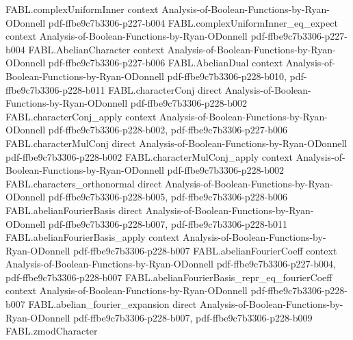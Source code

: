 \begin{theorem}
\label{FABL.abelian_plancherel}
\leanok
{}
\proofstep
  {FABL.complexUniformInner}
  {context}
  {Analysis-of-Boolean-Functions-by-Ryan-ODonnell}
  {pdf-ffbe9c7b3306-p227-b004}
\proofstep
  {FABL.complexUniformInner_eq_expect}
  {context}
  {Analysis-of-Boolean-Functions-by-Ryan-ODonnell}
  {pdf-ffbe9c7b3306-p227-b004}
\proofstep
  {FABL.AbelianCharacter}
  {context}
  {Analysis-of-Boolean-Functions-by-Ryan-ODonnell}
  {pdf-ffbe9c7b3306-p227-b006}
\proofstep
  {FABL.AbelianDual}
  {context}
  {Analysis-of-Boolean-Functions-by-Ryan-ODonnell}
  {pdf-ffbe9c7b3306-p228-b010,
    pdf-ffbe9c7b3306-p228-b011}
\proofstep
  {FABL.characterConj}
  {direct}
  {Analysis-of-Boolean-Functions-by-Ryan-ODonnell}
  {pdf-ffbe9c7b3306-p228-b002}
\proofstep
  {FABL.characterConj_apply}
  {context}
  {Analysis-of-Boolean-Functions-by-Ryan-ODonnell}
  {pdf-ffbe9c7b3306-p228-b002,
    pdf-ffbe9c7b3306-p227-b006}
\proofstep
  {FABL.characterMulConj}
  {direct}
  {Analysis-of-Boolean-Functions-by-Ryan-ODonnell}
  {pdf-ffbe9c7b3306-p228-b002}
\proofstep
  {FABL.characterMulConj_apply}
  {context}
  {Analysis-of-Boolean-Functions-by-Ryan-ODonnell}
  {pdf-ffbe9c7b3306-p228-b002}
\proofstep
  {FABL.characters_orthonormal}
  {direct}
  {Analysis-of-Boolean-Functions-by-Ryan-ODonnell}
  {pdf-ffbe9c7b3306-p228-b005,
    pdf-ffbe9c7b3306-p228-b006}
\proofstep
  {FABL.abelianFourierBasis}
  {direct}
  {Analysis-of-Boolean-Functions-by-Ryan-ODonnell}
  {pdf-ffbe9c7b3306-p228-b007,
    pdf-ffbe9c7b3306-p228-b011}
\proofstep
  {FABL.abelianFourierBasis_apply}
  {context}
  {Analysis-of-Boolean-Functions-by-Ryan-ODonnell}
  {pdf-ffbe9c7b3306-p228-b007}
\proofstep
  {FABL.abelianFourierCoeff}
  {context}
  {Analysis-of-Boolean-Functions-by-Ryan-ODonnell}
  {pdf-ffbe9c7b3306-p227-b004,
    pdf-ffbe9c7b3306-p228-b007}
\proofstep
  {FABL.abelianFourierBasis_repr_eq_fourierCoeff}
  {context}
  {Analysis-of-Boolean-Functions-by-Ryan-ODonnell}
  {pdf-ffbe9c7b3306-p228-b007}
\proofstep
  {FABL.abelian_fourier_expansion}
  {direct}
  {Analysis-of-Boolean-Functions-by-Ryan-ODonnell}
  {pdf-ffbe9c7b3306-p228-b007,
    pdf-ffbe9c7b3306-p228-b009}
\proofstep
  {FABL.zmodCharacter}

\end{theorem}
